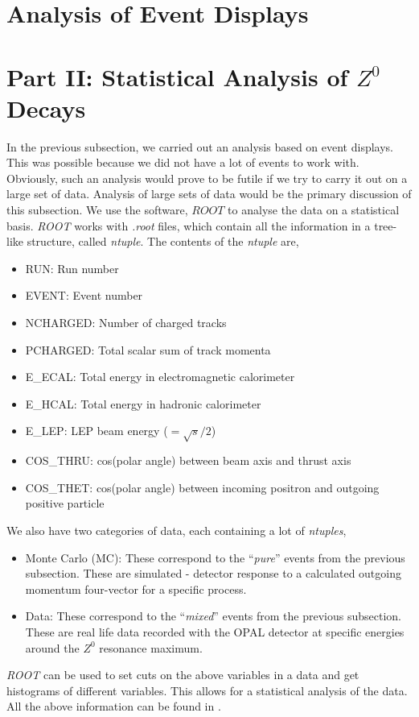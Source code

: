\section{Analysis of Event Displays}

\section{Part II: Statistical Analysis of $Z^0$ Decays}
In the previous subsection, we carried out an analysis based on event displays. This was possible because we did not have a lot of events to work with. Obviously, such an analysis would prove to be futile if we try to carry it out on a large set of data. Analysis of large sets of data would be the primary discussion of this subsection. We use the software, $ROOT$ to analyse the data on a statistical basis. \textit{ROOT} works with \textit{.root} files, which contain all the information in a tree-like structure, called \textit{ntuple}. The contents of the \textit{ntuple} are,
\begin{itemize}
    \item RUN: Run number
    \item EVENT: Event number
    \item NCHARGED: Number of charged tracks
    \item PCHARGED: Total scalar sum of track momenta
    \item E\_ECAL: Total energy in electromagnetic calorimeter
    \item E\_HCAL: Total energy in hadronic calorimeter
    \item E\_LEP: LEP beam energy ($=\sqrt{s}/2$)
    \item COS\_THRU: cos(polar angle) between beam axis and thrust axis
    \item COS\_THET: cos(polar angle) between incoming positron and outgoing positive particle
\end{itemize}
We also have two categories of data, each containing a lot of \textit{ntuples},
\begin{itemize}
    \item Monte Carlo (MC): These correspond to the ``\textit{pure}'' events from the previous subsection. These are simulated - detector response to a calculated outgoing momentum four-vector for a specific process.
    \item Data: These correspond to the ``\textit{mixed}'' events from the previous subsection. These are real life data recorded with the OPAL detector at specific energies around the $Z^0$ resonance maximum.
\end{itemize}
\textit{ROOT} can be used to set cuts on the above variables in a data and get histograms of different variables. This allows for a statistical analysis of the data. All the above information can be found in \cite{UB}.

